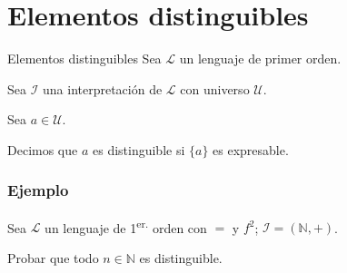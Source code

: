 \section{Elementos distinguibles}
\begin{definicion}{Elementos distinguibles}{}
    Sea $\mathcal{L}$ un lenguaje de primer orden.

    Sea $\mathcal{I}$ una interpretación de $\mathcal{L}$ con universo 
    $\mathcal{U}$.

    Sea $a \in \mathcal{U}$.

    \medskip

    Decimos que $a$ es distinguible si $\{ a \}$ es expresable.
\end{definicion}


\subsubsection{Ejemplo}

%
Sea $\mathcal{L}$ un lenguaje de 1\textsuperscript{er.} orden con $=$ y $f^2$;
$\mathcal{I} = (\mathbb{N}, +)$.

Probar que todo $n \in \mathbb{N}$ es distinguible.

